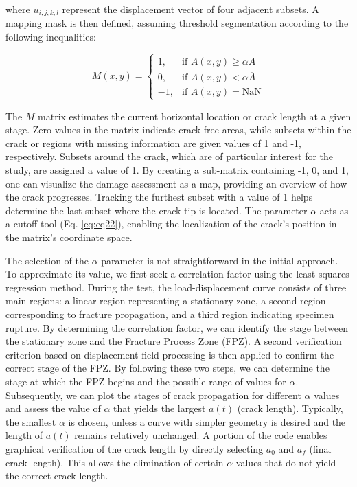 \documentclass[3p,times,procedia]{elsarticle}
\begin{document}
\noindent where $u_{i,j,k,l}$ represent the displacement vector of four adjacent subsets. A mapping mask is then defined, assuming threshold segmentation according to the following inequalities:

\begin{equation}
	M(x,y)=
	\begin{cases}
		1, & \text{if } A(x, y) \geq \alpha \overline{A} \\
		0, & \text{if } A(x, y) < \alpha \overline{A} \\
		-1, & \text{if } A(x, y) = \textrm{NaN}
	\end{cases}
	\label{eq:eq22}
\end{equation}

\noindent The $M$ matrix estimates the current horizontal location or crack length at a given stage. Zero values in the matrix indicate crack-free areas, while subsets within the crack or regions with missing information are given values of 1 and -1, respectively. Subsets around the crack, which are of particular interest for the study, are assigned a value of 1. By creating a sub-matrix containing -1, 0, and 1, one can visualize the damage assessment as a map, providing an overview of how the crack progresses. Tracking the furthest subset with a value of 1 helps determine the last subset where the crack tip is located. The parameter $\alpha$ acts as a cutoff tool (Eq. \ref*{eq:eq22}), enabling the localization of the crack's position in the matrix's coordinate space.

The selection of the $\alpha$ parameter is not straightforward in the initial approach. To approximate its value, we first seek a correlation factor using the least squares regression method. During the test, the load-displacement curve consists of three main regions: a linear region representing a stationary zone, a second region corresponding to fracture propagation, and a third region indicating specimen rupture. By determining the correlation factor, we can identify the stage between the stationary zone and the Fracture Process Zone (FPZ). A second verification criterion based on displacement field processing is then applied to confirm the correct stage of the FPZ. By following these two steps, we can determine the stage at which the FPZ begins and the possible range of values for $\alpha$. Subsequently, we can plot the stages of crack propagation for different $\alpha$ values and assess the value of $\alpha$ that yields the largest $a(t)$ (crack length). Typically, the smallest $\alpha$ is chosen, unless a curve with simpler geometry is desired and the length of $a(t)$ remains relatively unchanged. A portion of the code enables graphical verification of the crack length by directly selecting $a_0$ and $a_f$ (final crack length). This allows the elimination of certain $\alpha$ values that do not yield the correct crack length.
\end{document}
